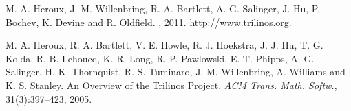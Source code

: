 
\begin{thebibliography}{1}
{\sc M. A. Heroux, J. M. Willenbring, R. A. Bartlett, A. G. Salinger, J. Hu, P. Bochev, K. Devine and R. Oldfield}.
, 2011.
\newblock http://www.trilinos.org.

{\sc M. A. Heroux, R. A. Bartlett, V. E. Howle, R. J. Hoekstra, J. J. Hu, T. G. Kolda, R. B. Lehoucq, K. R. Long, R. P. Pawlowski, E. T. Phipps, A. G. Salinger, H. K. Thornquist, R. S. Tuminaro, J. M. Willenbring, A. Williams and K. S. Stanley}. {An Overview of the Trilinos Project}. {\em ACM Trans. Math. Softw.}, 31(3):397--423, 2005.
\end{thebibliography}
